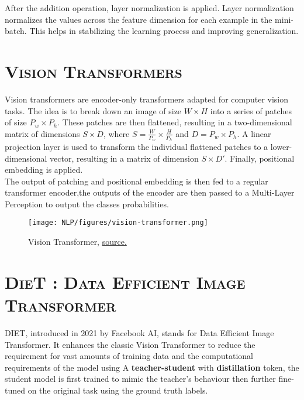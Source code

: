 \documentclass[a4paper,10pt]{article}
\begin{document}
\noindent After the addition operation, layer normalization is applied. Layer normalization normalizes the values across the feature dimension for each example in the mini-batch. This helps in stabilizing the learning process and improving generalization.

\section{\scshape{Vision Transformers}}

\noindent Vision transformers are encoder-only transformers adapted for computer vision tasks. The idea is to break down an image of size $W \times H$ into a series of patches of size $P_w \times P_h$. These patches are then flattened, resulting in a two-dimensional matrix of dimensions $S \times D$, where $S = \frac{W}{P_w} \times \frac{H}{P_h}$ and $D = P_w \times P_h$. A linear projection layer is used to transform the individual flattened patches to a lower-dimensional vector, resulting in a matrix of dimension $S \times D'$. Finally, positional embedding is applied.\\

\noindent The output of patching and positional embedding is then fed to a regular transformer encoder,the outputs of the encoder are then passed to a Multi-Layer Perception to output the classes probabilities. 

\begin{figure}[H]
    \centering
    \texttt{[image: NLP/figures/vision-transformer.png]}
    \caption{Vision Transformer, \textcolor{blue}{\href{https://paperswithcode.com/method/vision-transformer}{source.}}}
    \label{fig:enter-label}
\end{figure}

\newpage

\section{\scshape{DieT : Data Efficient Image Transformer}}

\noindent DIET, introduced in 2021 by Facebook AI, stands for Data Efficient Image Transformer. It enhances the classic Vision Transformer to reduce the requirement for vast amounts of training data and the computational requirements of the model using A \textbf{teacher-student} with \textbf{distillation} token, the student model is first trained to mimic the teacher's behaviour then further fine-tuned on the original task using the ground truth labels.\\
\end{document}
